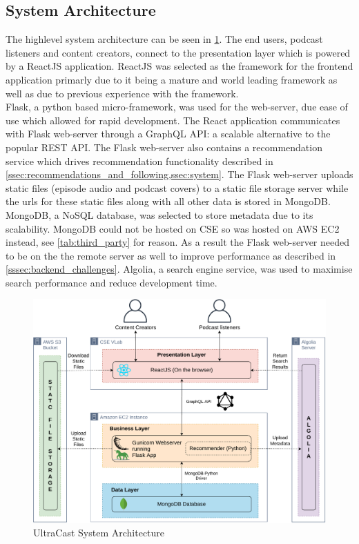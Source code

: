 \documentclass[../report.tex]{subfiles}
\begin{document}
\newpage

\subsection{System Architecture}

The highlevel system architecture can be seen in \cref{fig:system_architecture}.
The end users, podcast listeners and content creators, connect to the presentation layer 
which is powered by a ReactJS application. ReactJS was selected as the framework for the 
frontend application primarly due to it being a mature and world leading framework\cite{react} as well
as due to previous experience with the framework.\\

Flask, a python based micro-framework\cite{flask}, was used for the web-server, due ease of use which allowed
for rapid development. The React application communicates with Flask web-server through a GraphQL API: 
a scalable alternative to the popular REST API\cite{graphql}. The Flask web-server also contains a
recommendation service which drives recommendation functionality described in 
\cref{ssec:recommendations_and_following,ssec:system}. The Flask web-server uploads static files 
(episode audio and podcast covers) to a static file storage server while
the urls for these static files along with all other data is stored in MongoDB. MongoDB, a NoSQL database, 
was selected to store metadata due to its scalability\cite{MongoDB2020}. MongoDB could not be hosted on
CSE so was hosted on AWS EC2 instead, see \ref{tab:third_party} for reason. As a result the Flask web-server
needed to be on the the remote server as well to improve performance as described in \ref{sssec:backend_challenges}.
Algolia, a search engine service\cite{algolia}, was used to maximise search performance and reduce development time.

\begin{figure}[ht] 
    \centering
    \includegraphics[width=16cm]{resources/SystemArchitecture}
    \caption{UltraCast System Architecture}
    \label{fig:system_architecture} 
\end{figure}
\end{document}
